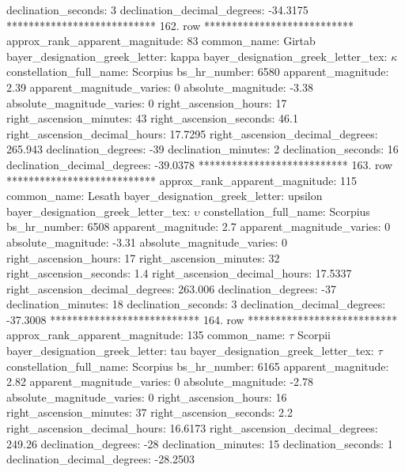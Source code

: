                declination_seconds: 3
       declination_decimal_degrees: -34.3175
*************************** 162. row ***************************
    approx_rank_apparent_magnitude: 83
                       common_name: Girtab
    bayer_designation_greek_letter: kappa
bayer_designation_greek_letter_tex: $\kappa$
           constellation_full_name: Scorpius
                      bs_hr_number: 6580
                apparent_magnitude: 2.39
         apparent_magnitude_varies: 0
                absolute_magnitude: -3.38
         absolute_magnitude_varies: 0
             right_ascension_hours: 17
           right_ascension_minutes: 43
           right_ascension_seconds: 46.1
     right_ascension_decimal_hours: 17.7295
   right_ascension_decimal_degrees: 265.943
               declination_degrees: -39
               declination_minutes: 2
               declination_seconds: 16
       declination_decimal_degrees: -39.0378
*************************** 163. row ***************************
    approx_rank_apparent_magnitude: 115
                       common_name: Lesath
    bayer_designation_greek_letter: upsilon
bayer_designation_greek_letter_tex: $\upsilon$
           constellation_full_name: Scorpius
                      bs_hr_number: 6508
                apparent_magnitude: 2.7
         apparent_magnitude_varies: 0
                absolute_magnitude: -3.31
         absolute_magnitude_varies: 0
             right_ascension_hours: 17
           right_ascension_minutes: 32
           right_ascension_seconds: 1.4
     right_ascension_decimal_hours: 17.5337
   right_ascension_decimal_degrees: 263.006
               declination_degrees: -37
               declination_minutes: 18
               declination_seconds: 3
       declination_decimal_degrees: -37.3008
*************************** 164. row ***************************
    approx_rank_apparent_magnitude: 135
                       common_name: $\tau$ Scorpii
    bayer_designation_greek_letter: tau
bayer_designation_greek_letter_tex: $\tau$
           constellation_full_name: Scorpius
                      bs_hr_number: 6165
                apparent_magnitude: 2.82
         apparent_magnitude_varies: 0
                absolute_magnitude: -2.78
         absolute_magnitude_varies: 0
             right_ascension_hours: 16
           right_ascension_minutes: 37
           right_ascension_seconds: 2.2
     right_ascension_decimal_hours: 16.6173
   right_ascension_decimal_degrees: 249.26
               declination_degrees: -28
               declination_minutes: 15
               declination_seconds: 1
       declination_decimal_degrees: -28.2503
